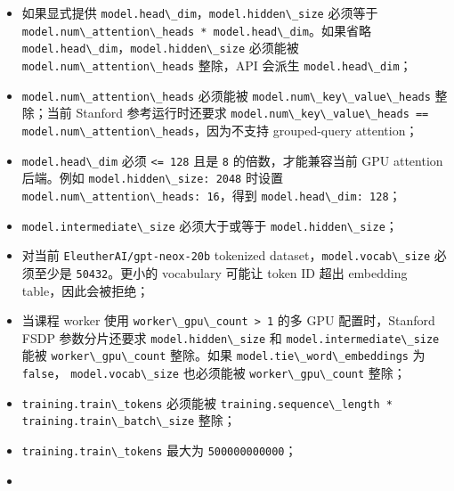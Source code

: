 \documentclass[
]{ctexart}
\newcommand{\passthrough}[1]{#1}
\providecommand{\tightlist}{%
  \setlength{\itemsep}{0pt}\setlength{\parskip}{0pt}}
\begin{document}
\begin{itemize}
\tightlist
\item
  如果显式提供 \passthrough{\lstinline!model.head\_dim!}，\passthrough{\lstinline!model.hidden\_size!}
  必须等于
  \passthrough{\lstinline!model.num\_attention\_heads * model.head\_dim!}。如果省略
  \passthrough{\lstinline!model.head\_dim!}，\passthrough{\lstinline!model.hidden\_size!}
  必须能被 \passthrough{\lstinline!model.num\_attention\_heads!}
  整除，API 会派生 \passthrough{\lstinline!model.head\_dim!}；
\item
  \passthrough{\lstinline!model.num\_attention\_heads!} 必须能被
  \passthrough{\lstinline!model.num\_key\_value\_heads!}
  整除；当前 Stanford 参考运行时还要求
  \passthrough{\lstinline!model.num\_key\_value\_heads == model.num\_attention\_heads!}，因为不支持
  grouped-query attention；
\item
  \passthrough{\lstinline!model.head\_dim!} 必须
  \passthrough{\lstinline!<= 128!} 且是 \passthrough{\lstinline!8!}
  的倍数，才能兼容当前 GPU attention 后端。例如
  \passthrough{\lstinline!model.hidden\_size: 2048!} 时设置
  \passthrough{\lstinline!model.num\_attention\_heads: 16!}，得到
  \passthrough{\lstinline!model.head\_dim: 128!}；
\item
  \passthrough{\lstinline!model.intermediate\_size!} 必须大于或等于
  \passthrough{\lstinline!model.hidden\_size!}；
\item
  对当前 \passthrough{\lstinline!EleutherAI/gpt-neox-20b!} tokenized
  dataset，\passthrough{\lstinline!model.vocab\_size!} 必须至少是
  \passthrough{\lstinline!50432!}。更小的 vocabulary 可能让 token ID
  超出 embedding table，因此会被拒绝；
\item
  当课程 worker 使用 \passthrough{\lstinline!worker\_gpu\_count > 1!}
  的多 GPU 配置时，Stanford FSDP 参数分片还要求
  \passthrough{\lstinline!model.hidden\_size!} 和
  \passthrough{\lstinline!model.intermediate\_size!} 能被
  \passthrough{\lstinline!worker\_gpu\_count!} 整除。如果
  \passthrough{\lstinline!model.tie\_word\_embeddings!} 为
  \passthrough{\lstinline!false!}，
  \passthrough{\lstinline!model.vocab\_size!} 也必须能被
  \passthrough{\lstinline!worker\_gpu\_count!} 整除；
\item
  \passthrough{\lstinline!training.train\_tokens!} 必须能被
  \passthrough{\lstinline!training.sequence\_length * training.train\_batch\_size!}
  整除；
\item
  \passthrough{\lstinline!training.train\_tokens!} 最大为
  \passthrough{\lstinline!500000000000!}；
\item

\end{itemize}
\end{document}
